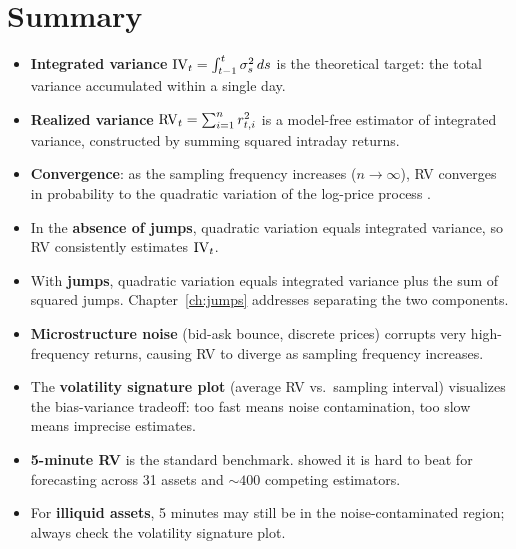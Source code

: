 
\section*{Summary}

\begin{itemize}[nosep]
  \item \textbf{Integrated variance} $\operatorname{IV}_t = \int_{t-1}^{t} \sigma^2_s\,ds$ is the theoretical target: the total variance accumulated within a single day.

  \item \textbf{Realized variance} $\operatorname{RV}_t = \sum_{i=1}^{n} r^2_{t,i}$ is a model-free estimator of integrated variance, constructed by summing squared intraday returns.

  \item \textbf{Convergence}: as the sampling frequency increases ($n \to \infty$), RV converges in probability to the quadratic variation of the log-price process \citep{ABDL2001, BNS2002}.

  \item In the \textbf{absence of jumps}, quadratic variation equals integrated variance, so RV consistently estimates $\operatorname{IV}_t$.

  \item With \textbf{jumps}, quadratic variation equals integrated variance plus the sum of squared jumps. Chapter~\ref{ch:jumps} addresses separating the two components.

  \item \textbf{Microstructure noise} (bid-ask bounce, discrete prices) corrupts very high-frequency returns, causing RV to diverge as sampling frequency increases.

  \item The \textbf{volatility signature plot} (average RV vs.\ sampling interval) visualizes the bias-variance tradeoff: too fast means noise contamination, too slow means imprecise estimates.

  \item \textbf{5-minute RV} is the standard benchmark. \citet{LPS2015} showed it is hard to beat for forecasting across 31 assets and ${\sim}400$ competing estimators.

  \item For \textbf{illiquid assets}, 5 minutes may still be in the noise-contaminated region; always check the volatility signature plot.


\end{itemize}
